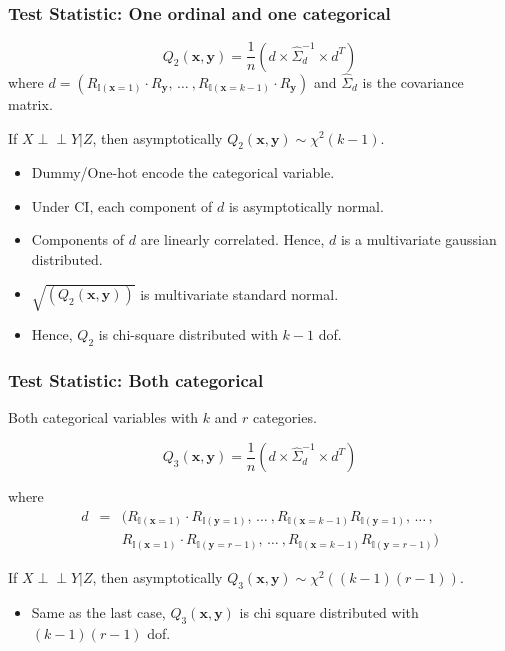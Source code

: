 \documentclass{beamer}
\def\ci{\perp\!\!\!\!\!\perp}
\begin{document}
\begin{frame}
	\frametitle{Test Statistic: One ordinal and one categorical}
	$$ Q_2(\bm{x}, \bm{y}) = \frac{1}{n} (d \times \hat{\Sigma}_d^{-1} \times d^T) $$
	where $ d = (R_{\mathbb{I}(\mathbf{x}=1)} \cdot R_{\mathbf{y}}, \, \ldots \ ,
		R_{\mathbb{I}(\mathbf{x}=k-1)} \cdot R_{\mathbf{y}})$ and $ \hat{\Sigma}_d $ is the covariance matrix.

	\vspace{1em}
	If $ X \ci Y | Z $, then asymptotically $ Q_2(\bm{x}, \bm{y}) \sim \chi^2(k-1) $.

	\begin{itemize}
		\setlength\itemsep{1em}
		\item Dummy/One-hot encode the categorical variable.
		\item Under CI, each component of $ d $ is asymptotically normal.
		\item Components of $ d $ are linearly correlated. Hence, $ d $ is 
			a multivariate gaussian distributed.
		\item $ \sqrt{(Q_2(\bm{x}, \bm{y}))} $ is multivariate standard normal.
		\item Hence, $ Q_2 $ is chi-square distributed with $ k-1 $ dof.
	\end{itemize}
\end{frame}

\begin{frame}
	\frametitle{Test Statistic: Both categorical}
	Both categorical variables with $ k $ and $ r $ categories.


	$$ Q_3(\bm{x}, \bm{y}) = \frac{1}{n} (d \times \hat{\Sigma}_d^{-1} \times d^T) $$

	where 
	\begin{eqnarray*}
		d &  =  & (R_{\mathbb{I}(\mathbf{x}=1)} \cdot R_{\mathbb{I}(\mathbf{y}=1)}, \, \ldots \ ,
		R_{\mathbb{I}(\mathbf{x}=k-1)} R_{\mathbb{I}(\mathbf{y}=1)}, \, \ldots \, ,
		\\
	 	& & R_{\mathbb{I}(\mathbf{x}=1)} \cdot R_{\mathbb{I}(\mathbf{y}=r-1)}, \, \ldots \ ,
		R_{\mathbb{I}(\mathbf{x}=k-1)} R_{\mathbb{I}(\mathbf{y}=r-1)}
		)
	\end{eqnarray*}
	\vspace{1em}

	If $ X \ci Y | Z $, then asymptotically $ Q_3(\bm{x}, \bm{y}) \sim \chi^2((k-1)(r-1)) $.

	\begin{itemize}
		\setlength\itemsep{1em}
		\item Same as the last case, $ Q_3(\bm{x}, \bm{y}) $ is chi square distributed 
			with $ (k-1)(r-1) $ dof.
	\end{itemize}
\end{frame}
\end{document}

